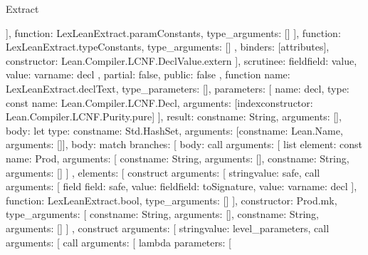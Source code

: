 \begin{lexlean}{Extract}
\begin{toolingmodule}
{{{{{{{                    }
                  ],
                  function: LexLeanExtract.paramConstants,
                  type_arguments: []
                }
              ],
              function: LexLeanExtract.typeConstants,
              type_arguments: []
            },
            binders: [attributes],
            constructor: Lean.Compiler.LCNF.DeclValue.extern
          }
        ],
        scrutinee: field{field: value, value: var{name: decl}}
      },
      partial: false,
      public: false
    },
    function{
      name: LexLeanExtract.declText,
      type_parameters: [],
      parameters: [
        {
          name: decl,
          type: const{
            name: Lean.Compiler.LCNF.Decl,
            arguments: [index{constructor: Lean.Compiler.LCNF.Purity.pure}]
          }
        }
      ],
      result: const{name: String, arguments: []},
      body: let{
        type: const{name: Std.HashSet, arguments: [const{name: Lean.Name, arguments: []}]},
        body: match{
          branches: [
            {
              body: call{
                arguments: [
                  list{
                    element: const{
                      name: Prod,
                      arguments: [
                        const{name: String, arguments: []},
                        const{name: String, arguments: []}
                      ]
                    },
                    elements: [
                      construct{
                        arguments: [
                          string{value: safe},
                          call{
                            arguments: [
                              field{
                                field: safe,
                                value: field{field: toSignature, value: var{name: decl}}
                              }
                            ],
                            function: LexLeanExtract.bool,
                            type_arguments: []
                          }
                        ],
                        constructor: Prod.mk,
                        type_arguments: [
                          const{name: String, arguments: []},
                          const{name: String, arguments: []}
                        ]
                      },
                      construct{
                        arguments: [
                          string{value: level_parameters},
                          call{
                            arguments: [
                              call{
                                arguments: [
                                  lambda{
                                    parameters: [
}}}}}}}}}}}
\end{toolingmodule}
\end{lexlean}
